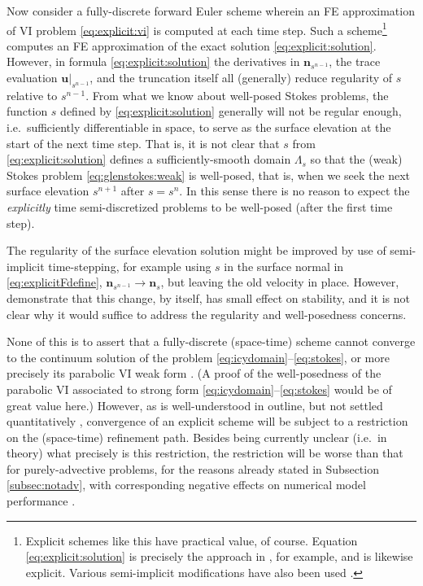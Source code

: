 \documentclass[hidelinks,onefignum,onetabnum,final]{siamart220329}  %
\newcommand{\bn}{\mathbf{n}}
\newcommand{\bu}{\mathbf{u}}
\begin{document}
Now consider a fully-discrete forward Euler scheme wherein an FE approximation of VI problem \eqref{eq:explicit:vi} is computed at each time step.  Such a scheme\footnote{Explicit schemes like this have practical value, of course.  Equation \eqref{eq:explicit:solution} is precisely the approach in \cite{Lengetal2012}, for example, and \cite{Jouvetetal2008} is likewise explicit.  Various semi-implicit modifications have also been used \cite{Chengetal2020,Durandetal2009,LofgrenAhlkronaHelanow2022,WirbelJarosch2020}.} computes an FE approximation of the exact solution \eqref{eq:explicit:solution}.  However, in formula \eqref{eq:explicit:solution} the derivatives in $\bn_{s^{n-1}}$, the trace evaluation $\bu|_{s^{n-1}}$, and the truncation itself all (generally) reduce regularity of $s$  relative to $s^{n-1}$.  From what we know about well-posed Stokes problems, the function $s$ defined by \eqref{eq:explicit:solution} generally will not be regular enough, i.e.~sufficiently differentiable in space, to serve as the surface elevation at the start of the next time step.  That is, it is not clear that $s$ from \eqref{eq:explicit:solution} defines a sufficiently-smooth domain $\Lambda_s$ so that the (weak) Stokes problem \eqref{eq:glenstokes:weak} is well-posed, that is, when we seek the next surface elevation $s^{n+1}$ after $s=s^n$.  In this sense there is no reason to expect the \emph{explicitly} time semi-discretized problems to be well-posed (after the first time step).

The regularity of the surface elevation solution might be improved by use of semi-implicit time-stepping, for example using $s$ in the surface normal in \eqref{eq:explicitFdefine}, $\bn_{s^{n-1}} \to \bn_s$, but leaving the old velocity in place.  However, \cite{LofgrenAhlkronaHelanow2022} demonstrate that this change, by itself, has small effect on stability, and it is not clear why it would suffice to address the regularity and well-posedness concerns.

None of this is to assert that a fully-discrete (space-time) scheme cannot converge to the continuum solution of the problem \eqref{eq:icydomain}--\eqref{eq:stokes}, or more precisely its
parabolic VI weak form \cite{Glowinski1984}.  (A proof of the well-posedness of the parabolic VI associated to strong form \eqref{eq:icydomain}--\eqref{eq:stokes} would be of great value here.)  However, as is well-understood in outline, but not settled quantitatively \cite{Chengetal2017}, convergence of an explicit scheme will be subject to a restriction on the (space-time) refinement path.  Besides being currently unclear (i.e.~in theory) what precisely is this restriction, the restriction will be worse than that for purely-advective problems, for the reasons already stated in Subsection \ref{subsec:notadv}, with corresponding negative effects on numerical model performance \cite{Bueler2023}.
\end{document}
